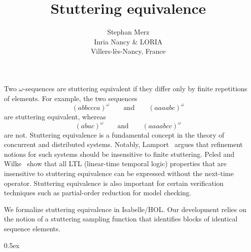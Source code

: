 \documentclass[11pt,a4paper]{article}
\begin{document}
\title{Stuttering equivalence}
\author{
  Stephan Merz\\
  Inria Nancy \& LORIA\\
  Villers-l\`es-Nancy, France
}
\maketitle

\noindent%
Two $\omega$-sequences are stuttering equivalent if they differ only by
finite repetitions of elements. For example, the two sequences
\[
  (abbccca)^{\omega} \qquad\textrm{and}\qquad
  (aaaabc)^{\omega}
\]
are stuttering equivalent, whereas
\[
  (abac)^{\omega} \qquad\textrm{and}\qquad
  (aaaabcc)^{\omega}
\]
are not. Stuttering equivalence is a fundamental concept in the theory
of concurrent and distributed systems. Notably, Lamport~\cite{lamport:what-good}
argues that refinement notions for such systems should be insensitive to
finite stuttering. Peled and Wilke~\cite{peled:ltl-x} show that all LTL
(linear-time temporal logic) properties that are insensitive to stuttering
equivalence can be expressed without the next-time operator. Stuttering
equivalence is also important for certain verification techniques
such as partial-order reduction for model checking.

We formalize stuttering equivalence in Isabelle/HOL. Our development relies
on the notion of a stuttering sampling function that identifies blocks of 
identical sequence elements.


\tableofcontents

\parindent 0pt\parskip 0.5ex





\end{document}
